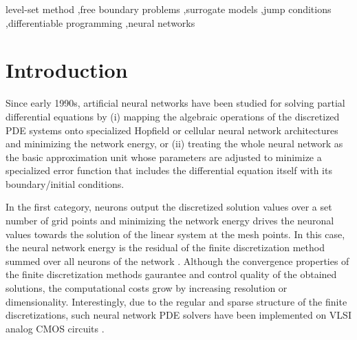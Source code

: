 \documentclass{elsarticle}
\begin{document}
\begin{keyword}
	level-set method \sep free boundary problems \sep surrogate models \sep jump conditions \sep differentiable programming \sep neural networks
\end{keyword}

\maketitle
\def\thefootnote{$\dagger$}







\section{Introduction}
\label{sec::introduction}

Since early 1990s, artificial neural networks have been studied for solving partial differential equations by (i) mapping the algebraic operations of the discretized PDE systems onto specialized Hopfield or cellular neural network architectures and minimizing the network energy, or (ii) treating the whole neural network as the basic approximation unit whose parameters are adjusted to minimize a specialized error function that includes the differential equation itself with its boundary/initial conditions. 


In the first category, neurons output the discretized solution values over a set number of grid points and minimizing the network energy drives the neuronal values towards the solution of the linear system at the mesh points. In this case, the neural network energy is the residual of the finite discretization method summed over all neurons of the network \cite{lee1990neural}. Although the convergence properties of the finite discretization methods gaurantee and control quality of the obtained solutions, the computational costs grow by increasing resolution or dimensionality. Interestingly, due to the regular and sparse structure of the finite discretizations, such neural network PDE solvers have been implemented on VLSI analog CMOS circuits \cite{gobovic1993design,chua1988cellular,chua1988cellularA}.
\end{document}
